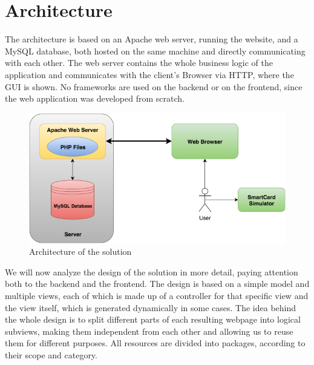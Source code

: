 \section{Architecture}\label{section:architecture}
The architecture is based on an Apache web server, running the \gnb{} website, and a MySQL database, both hosted on the same machine and directly communicating with each other. The web server contains the whole business logic of the application and communicates with the client's Browser via HTTP, where the GUI is shown. No frameworks are used on the backend or on the frontend, since the web application was developed from scratch.\newline
\begin{figure}[h!tbp]
	\centering
	\includegraphics[width=\textwidth]{figures/gnb_architecture.png}
	\caption{Architecture of the solution}
	\label{figure:architecture}
\end{figure}
We will now analyze the design of the solution in more detail, paying attention both to the backend and the frontend.\newline
The design is based on a simple model and multiple views, each of which is made up of a controller for that specific view and the view itself, which is generated dynamically in some cases.
The idea behind the whole design is to split different parts of each resulting webpage into logical subviews, making them independent from each other and allowing us to reuse them for different purposes.\newline
All resources are divided into packages, according to their scope and category.

